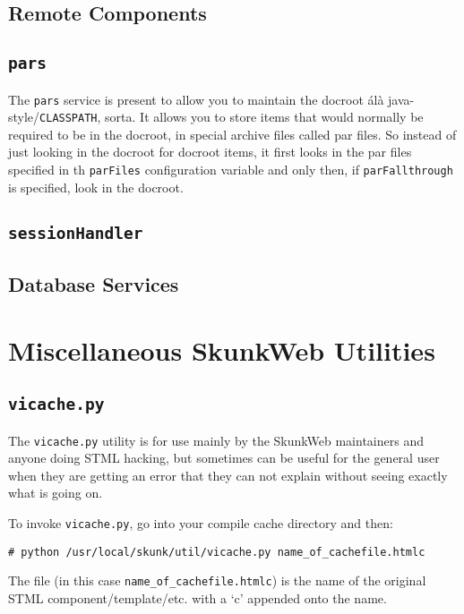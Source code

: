 \documentclass[titlepage]{manual}
\begin{document}
\section{Remote Components}
\label{remotecomponents}


\section{\texttt{pars}}
The \texttt{pars} service is present to allow you to maintain the
docroot \'al\`a java-style/\texttt{CLASSPATH}, sorta.  It allows you
to store items that would normally be required to be in the docroot,
in special archive files called par files.  So instead of just looking
in the docroot for docroot items, it first looks in the par files
specified in th \texttt{parFiles} configuration variable and only
then, if \texttt{parFallthrough} is specified, look in the docroot.

\section{\texttt{sessionHandler}}

\section{Database Services}
\label{databaseservices}

\chapter{Miscellaneous SkunkWeb Utilities}
\section{\texttt{vicache.py}}
The \texttt{vicache.py} utility is for use mainly by the SkunkWeb maintainers
and anyone doing STML hacking, but sometimes can be useful for the general
user when they are getting an error that they can not explain without
seeing exactly what is going on.

To invoke \texttt{vicache.py}, go into your compile cache directory
and then:
\begin{verbatim}
# python /usr/local/skunk/util/vicache.py name_of_cachefile.htmlc
\end{verbatim}
The file (in this case \texttt{name\_of\_cachefile.htmlc}) is the name
of the original STML component/template/etc. with a `c' appended onto
the name.  
\end{document}
